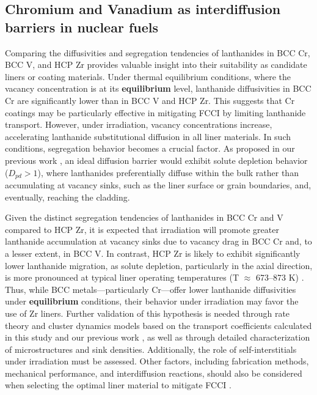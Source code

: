 \documentclass[preprint,12pt]{elsarticle}
\providecommand{\DIFaddtex}[1]{{\bf #1}} %
\providecommand{\DIFdeltex}[1]{} %
\providecommand{\DIFaddbegin}{\protect\color{blue}} %
\providecommand{\DIFaddend}{\protect\color{black}} %
\providecommand{\DIFdelbegin}{\protect\color{red}} %
\providecommand{\DIFdelend}{\protect\color{black}} %
\providecommand{\DIFadd}[1]{\texorpdfstring{\DIFaddtex{#1}}{#1}} %
\providecommand{\DIFdel}[1]{\texorpdfstring{\DIFdeltex{#1}}{}} %
\newcommand{\DIFscaledelfig}{0.5}
\newlength{\DIFdelgraphicswidth} %
\newlength{\DIFdelgraphicsheight} %
\newcommand{\DIFaddincludegraphics}[2][]{{\color{blue}\fbox{\DIFOincludegraphics[#1]{#2}}}} %
\newcommand{\DIFdelincludegraphics}[2][]{%
\sbox{\DIFdelgraphicsbox}{\DIFOincludegraphics[#1]{#2}}%
\settoboxwidth{\DIFdelgraphicswidth}{\DIFdelgraphicsbox} %
\settoboxtotalheight{\DIFdelgraphicsheight}{\DIFdelgraphicsbox} %
\scalebox{\DIFscaledelfig}{%
\parbox[b]{\DIFdelgraphicswidth}{\usebox{\DIFdelgraphicsbox}\\[-\baselineskip] \rule{\DIFdelgraphicswidth}{0em}}\llap{\resizebox{\DIFdelgraphicswidth}{\DIFdelgraphicsheight}{%
\setlength{\unitlength}{\DIFdelgraphicswidth}%
\begin{picture}(1,1)%
\thicklines\linethickness{2pt} %
{\color[rgb]{1,0,0}\put(0,0){\framebox(1,1){}}}%
{\color[rgb]{1,0,0}\put(0,0){\line( 1,1){1}}}%
{\color[rgb]{1,0,0}\put(0,1){\line(1,-1){1}}}%
\end{picture}%
}\hspace*{3pt}}} %
} %
\DeclareRobustCommand{\DIFaddbegin}{\DIFOaddbegin \let\includegraphics\DIFaddincludegraphics} %
\DeclareRobustCommand{\DIFaddend}{\DIFOaddend \let\includegraphics\DIFOincludegraphics} %
\DeclareRobustCommand{\DIFdelbegin}{\DIFOdelbegin \let\includegraphics\DIFdelincludegraphics} %
\DeclareRobustCommand{\DIFdelend}{\DIFOaddend \let\includegraphics\DIFOincludegraphics} %
\begin{document}
\subsection{Chromium and Vanadium as interdiffusion barriers in nuclear fuels}
Comparing the diffusivities and segregation tendencies of lanthanides in BCC Cr, BCC V, and HCP Zr provides valuable insight into their suitability as candidate liners or coating materials. Under thermal equilibrium conditions, where the vacancy concentration is at its \DIFdelbegin \DIFdel{standard }\DIFdelend \DIFaddbegin \DIFadd{equilibrium }\DIFaddend level, lanthanide diffusivities in BCC Cr are significantly lower than in BCC V and HCP Zr. This suggests that Cr coatings may be particularly effective in mitigating FCCI by limiting lanthanide transport. However, under irradiation, vacancy concentrations increase, accelerating lanthanide substitutional diffusion in all liner materials. In such conditions, segregation behavior becomes a crucial factor. As proposed in our previous work \citep{shousha2024first}, an ideal diffusion barrier would exhibit solute depletion behavior ($D_{pd} > 1$), where lanthanides preferentially diffuse within the bulk rather than accumulating at vacancy sinks, such as the liner surface or grain boundaries, and, eventually, reaching the cladding.

Given the distinct segregation tendencies of lanthanides in BCC Cr and V compared to HCP Zr, it is expected that irradiation will promote greater lanthanide accumulation at vacancy sinks due to vacancy drag in BCC Cr and, to a lesser extent, in BCC V. In contrast, HCP Zr is likely to exhibit significantly lower lanthanide migration, as solute depletion, particularly in the axial direction, is more pronounced at typical liner operating temperatures (T $\approx$ 673–873 K) \citep{beausoleil_fast_2022}. Thus, while BCC metals—particularly Cr—offer lower lanthanide diffusivities under \DIFdelbegin \DIFdel{standard }\DIFdelend \DIFaddbegin \DIFadd{equilibrium }\DIFaddend conditions, their behavior under irradiation may favor the use of Zr liners. Further validation of this hypothesis is needed through rate theory and cluster dynamics models based on the transport coefficients calculated in this study and our previous work \citep{shousha2024first}, as well as through detailed characterization of microstructures and sink densities. Additionally, the role of self-interstitials under irradiation must be assessed. Other factors, including fabrication methods, mechanical performance, and interdiffusion reactions, should also be considered when selecting the optimal liner material to mitigate FCCI \cite{OH2024113102}.
\end{document}
